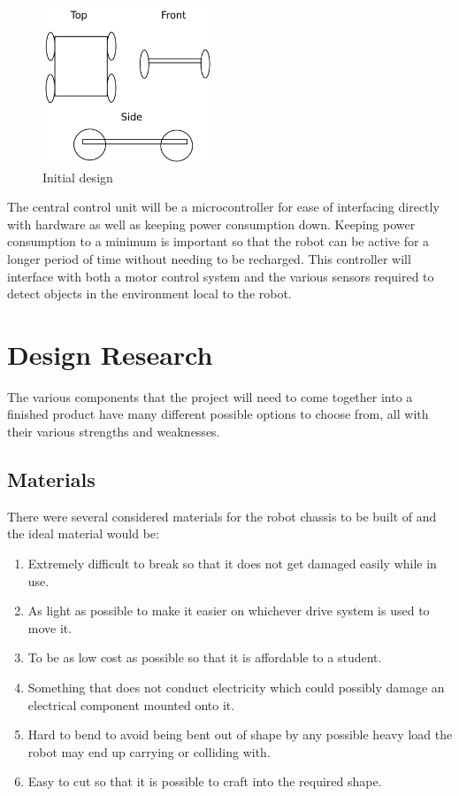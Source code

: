 \begin{figure}[h]
\centering
        \includegraphics[width=2.0in] {Images/initial-design.png}
        \caption{Initial design}
        \label{Initial design}
\end{figure}

The central control unit will be a microcontroller for ease of interfacing directly with hardware as well as keeping power consumption down.  Keeping power consumption to a minimum is important so that the robot can be active for a longer period of time without needing to be recharged.  This controller will interface with both a motor control system and the various sensors required to detect objects in the environment local to the robot.

\section{Design Research}
The various components that the project will need to come together into a finished product have many different possible options to choose from, all with their various strengths and weaknesses.
\subsection{Materials}
There were several considered materials for the robot chassis to be built of and the ideal material would be:
\begin{enumerate}
\item Extremely difficult to break so that it does not get damaged easily while in use.
\item As light as possible to make it easier on whichever drive system is used to move it.
\item To be as low cost as possible so that it is affordable to a student.
\item Something that does not conduct electricity which could possibly damage an electrical component mounted onto it.
\item Hard to bend to avoid being bent out of shape by any possible heavy load the robot may end up carrying or colliding with.
\item Easy to cut so that it is possible to craft into the required shape.
\end{enumerate}


